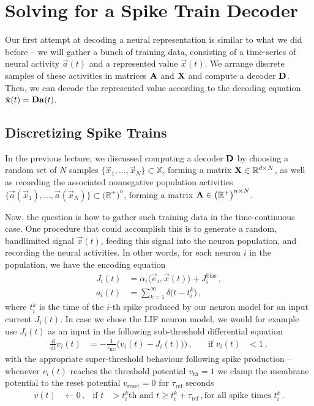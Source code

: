 \documentclass[10pt,letterpaper,oneside]{article}
\begin{document}
\section{Solving for a Spike Train Decoder}

Our first attempt at decoding a neural representation is similar to what we did before -- we will gather a bunch of training data, consisting of a time-series of neural activity $\vec a(t)$ and a represented value $\vec x(t)$. We arrange discrete samples of these activities in matrices ${\mathbf{A}}$ and ${\mathbf{X}}$ and compute a decoder ${\mathbf{D}}$. Then, we can decode the represented value according to the decoding equation $\hat{{\mathbf{x}}}(t) = {\mathbf{D}} {\mathbf{a}}(t)$.


\subsection{Discretizing Spike Trains}

In the previous lecture, we discussed computing a decoder ${\mathbf{D}}$ by choosing a random set of $N$ samples $\big\{ \vec x_1, \ldots, \vec x_N \big\} \subset \mathbb{X}$, forming a matrix ${\mathbf{X}} \in \mathbb{R}^{d \times N}$, as well as recording the associated nonnegative population activities $\big\{ \vec a(\vec x_1), \ldots, \vec a(\vec x_N) \big\} \subset \big(\mathbb{R}^{+} \big)^n$, forming a matrix ${\mathbf{A}} \in \big(\mathbb{R}^{+}\big)^{n \times N}$.

Now, the question is how to gather such training data in the time-continuous case. One procedure that could accomplish this is to generate a random, bandlimited signal $\vec x(t)$, feeding this signal into the neuron population, and recording the neural activities. In other words, for each neuron $i$ in the population, we have the encoding equation
\begin{align*}
J_i(t) &= \alpha_i \langle \vec e_i, \vec x(t) \rangle + J^\mathrm{bias}_i \,, \\
a_i(t) &= \sum_{k=1}^\infty \delta\big(t - t^k_i\big) \,,
\end{align*}
where $t^k_i$ is the time of the $i$-th spike produced by our neuron model for an input current $J_i(t)$. In case we chose the LIF neuron model, we would for example use $J_i(t)$ as an input in the following sub-threshold differential equation
\begin{align*}
\frac{\mathrm{d}}{\mathrm{d}t} v_i(t) &= -\frac{1}{\tau_\mathrm{RC}} \big( v_i(t) - J_i(t) \big)
\big) \,, \quad &\text{if } v_i(t) &< 1\,,
\end{align*}
with the appropriate super-threshold behaviour following spike production -- whenever $v_i(t)$ reaches the threshold potential $v_\mathrm{th} = 1$ we clamp the membrane potential to the reset potential $v_\mathrm{reset} = 0$ for $\tau_\mathrm{ref}$ seconds
\begin{align*}
v(t) &\gets 0 \,, &\text{if } t &> t_i^k\mathrm{th} \text{ and } t \geq t_i^k + \tau_\mathrm{ref} \,, \text{for all spike times } t_i^k \,.
\end{align*}
\end{document}
